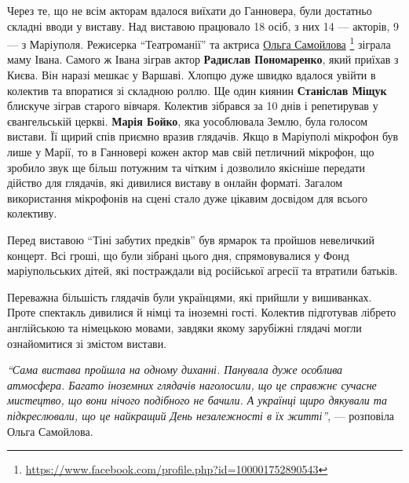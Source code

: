 
Через те, що не всім акторам вдалося виїхати до Ганновера, були достатньо
складні вводи у виставу. Над виставою працювало 18 осіб, з них 14 — акторів, 9
— з Маріуполя. Режисерка \enquote{Театроманії} та актриса \href{https://www.facebook.com/profile.php?id=100001752890543}{%
Ольга Самойлова}%
\footnote{\url{https://www.facebook.com/profile.php?id=100001752890543}} %
зіграла маму
Івана. Самого ж Івана зіграв актор \textbf{Радислав Пономаренко}, який приїхав з Києва.
Він наразі мешкає у Варшаві. Хлопцю дуже швидко вдалося увійти в колектив та
впоратися зі складною роллю. Ще один киянин \textbf{Станіслав Міщук} блискуче зіграв
старого вівчаря. Колектив зібрався за 10 днів і репетирував у євангельській
церкві. \textbf{Марія Бойко}, яка уособлювала Землю, була голосом вистави. Її щирий спів
приємно вразив глядачів. Якщо в Маріуполі мікрофон був лише у Марії, то в
Ганновері кожен актор мав свій петличний мікрофон, що зробило звук ще більш
потужним та чітким і дозволило якісніше передати дійство для глядачів, які
дивилися виставу в онлайн форматі. Загалом використання мікрофонів на сцені
стало дуже цікавим досвідом для всього колективу.


Перед виставою \enquote{Тіні забутих предків} був ярмарок та пройшов невеличкий
концерт. Всі гроші, що були зібрані цього дня, спрямовувалися у Фонд
маріупольських дітей, які постраждали від російської агресії та втратили
батьків.

Переважна більшість глядачів були українцями, які прийшли у вишиванках. Проте
спектакль дивилися й німці та іноземні гості. Колектив підготував лібрето
англійською та німецькою мовами, завдяки якому зарубіжні глядачі могли
ознайомитися зі змістом вистави. 



\begin{leftbar}
  \begingroup
\emph{\enquote{Сама вистава пройшла на одному диханні. Панувала дуже особлива
атмосфера. Багато іноземних глядачів наголосили, що це справжнє сучасне
мистецтво, що вони нічого подібного не бачили. А українці щиро дякували
та підкреслювали, що це найкращий День незалежності в їх житті}}, —
розповіла Ольга Самойлова.
   \endgroup
\end{leftbar}

